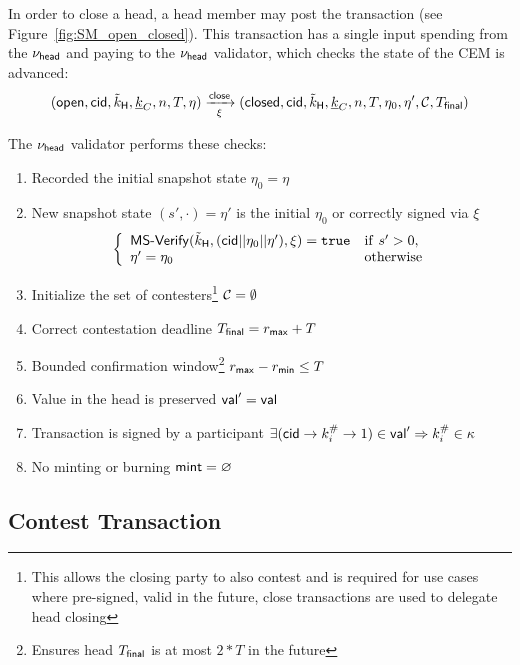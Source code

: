 

In order to close a head, a head member may post the \mtxClose{} transaction
(see Figure~\ref{fig:SM_open_closed}). This transaction has a single input
spending from the $\nu_\mathsf{head}$ and paying to the $\nu_\mathsf{head}$ validator, which checks
the state of the CEM is advanced:
\[
  (\mathsf{open},\mathsf{cid},\tilde{k}_{\mathsf{H}},\underline{k}_C,n,T,\eta) \xrightarrow[\xi]{\mathsf{close}} (\mathsf{closed},\mathsf{cid},\tilde{k}_{\mathsf{H}},\underline{k}_C,n,T,\eta_0,\eta',\mathcal{C},T_{\mathsf{final}})
\]

\noindent The $\nu_\mathsf{head}$ validator performs these checks:
\begin{enumerate}
  \item Recorded the initial snapshot state $\eta_0 = \eta$
  \item New snapshot state $(s', \cdot) = \eta'$ is the initial $\eta_{0}$
        or correctly signed via $\xi$ \\
        \[
          \left\{\begin{array}{ll}
                  \mathsf{MS\textsf{-}{}Verify}(\tilde{k}_{\mathsf{H}},(\mathsf{cid} || \eta_{0} || \eta'),\xi) = \mathtt{true} & \mathrm{if} ~ s' > 0, \\
                  \eta' = \eta_{0} & \mathrm{otherwise}
                 \end{array}\right.
        \]
  \item Initialize the set of contesters\footnote{This allows the closing party
        to also contest and is required for use cases where pre-signed, valid in
        the future, close transactions are used to delegate head closing}
        $\mathcal{C} = \emptyset$
  \item Correct contestation deadline $T_{\mathsf{final}} = r_{\mathsf{max}} + T$
  \item Bounded confirmation window\footnote{Ensures head $T_{\mathsf{final}}$ is at most
        $2*T$ in the future} $r_{\mathsf{max}} - r_{\mathsf{min}} \leq T$
  \item Value in the head is preserved $\mathsf{val}' = \mathsf{val}$
  \item Transaction is signed by a participant $\exists (\mathsf{cid} \rightarrow k^{\#}_{i} \rightarrow 1) \in \mathsf{val}' \Rightarrow k^{\#}_{i} \in \kappa$
  \item No minting or burning $\mathsf{mint} = \varnothing$
\end{enumerate}

\subsection{Contest Transaction}\label{sec:contest-tx}


